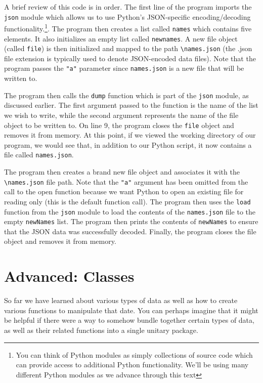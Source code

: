 \documentclass{book}
\begin{document}
A brief review of this code is in order. The first line of the program imports the \texttt{json} module which allows us to use Python's JSON-specific encoding/decoding functionality.\footnote{You can think of Python modules as simply collections of source code which can provide access to additional Python functionality. We'll be using many different Python modules as we advance through this text}. The program then creates a list called \texttt{names} which contains five elements. It also initializes an empty list called \texttt{newnames}. A new file object (called \texttt{file}) is then initialized and mapped to the path \texttt{\textbackslash names.json} (the .json file extension is typically used to denote JSON-encoded data files). Note that the program passes the \texttt{"a"} parameter since \texttt{names.json} is a new file that will be written to.

The program then calls the \texttt{dump} function which is part of the \texttt{json} module, as discussed earlier. The first argument passed to the function is the name of the list we wish to write, while the second argument represents the name of the file object to be written to. On line 9, the program closes the \texttt{file} object and removes it from memory. At this point, if we viewed the working directory of our program, we would see that, in addition to our Python script, it now contains a file called \texttt{names.json}.

The program then creates a brand new file object and associates it with the \texttt{\textbackslash names.json} file path. Note that the \texttt{"a"} argument has been omitted from the call to the open function because we want Python to open an existing file for reading only (this is the default function call). The program then uses the \texttt{load} function from the \texttt{json} module to load the contents of the \texttt{names.json} file to the empty \texttt{newNames} list. The program then prints the contents of \texttt{newNames} to ensure that the JSON data was successfully decoded. Finally, the program closes the file object and removes it from memory.

\section{Advanced: Classes}

So far we have learned about various types of data as well as how to create various functions to manipulate that date. You can perhaps imagine that it might be helpful if there were a way to somehow bundle together certain types of data, as well as their related functions into a single unitary package. 
\end{document}

